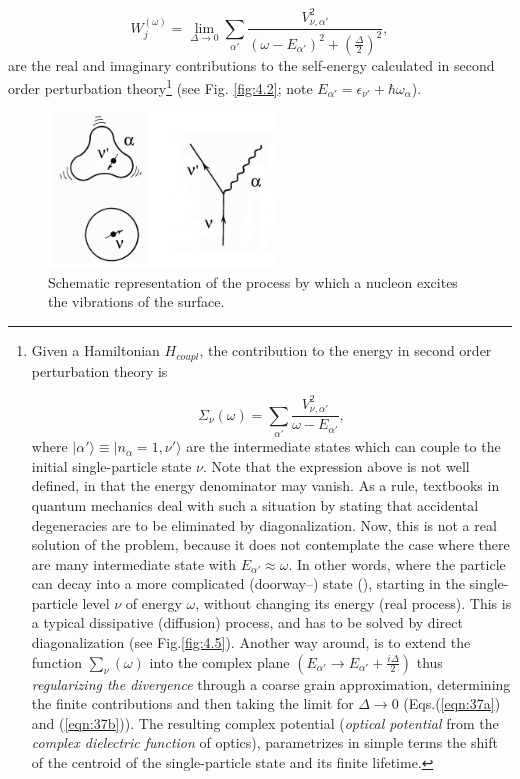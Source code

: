 \begin{equation}
W_j^{(\omega)}  = \lim_{\Delta \rightarrow 0} \sum_{\alpha'} \frac{V_{\nu ,\alpha'}^2}{(\omega -E_{\alpha'})^2 + (\frac{\Delta}{2})^2},
\label{eqn:37b}
\end{equation}
are the real and imaginary contributions to the self-energy calculated in second order perturbation theory\footnote{Given a Hamiltonian $H_{coupl}$, the contribution to the energy in second order perturbation theory is

{\protect
\begin{equation}
\nonumber\Sigma_{\nu}(\omega) = \sum_{\alpha'} \frac{V_{\nu ,\alpha'}^2}{\omega - E_{\alpha'}} ,
\label{eqn:37c}
\end{equation}
}
where $|\alpha' \rangle \equiv |n_{\alpha}=1,\nu' \rangle$ are the intermediate states which can couple to the initial single-particle state $\nu$. Note that the expression above is not well defined, in that the energy denominator may vanish. As a rule, textbooks in quantum mechanics deal with such a situation by stating that accidental degeneracies are to be eliminated by diagonalization. Now, this is not a real solution of the problem, because it does not contemplate the case where there are many intermediate state with $E_{\alpha'} \approx \omega$. In other words, where the particle can decay into a more complicated (doorway--) state (\cite{Feshbach:58}), starting in the single-particle level $\nu$ of energy $\omega$, without changing its energy (real process). This is a typical dissipative (diffusion) process, and has to be solved by direct diagonalization (see Fig.\ref{fig:4.5}). Another way around, is to extend the function $\sum_{\nu}(\omega)$ into the complex plane $(E_{\alpha'} \rightarrow E_{\alpha'} + \frac{i\Delta}{2})$ thus {\it regularizing the divergence} through a coarse grain approximation, determining the finite contributions and then taking the limit for $\Delta \rightarrow 0$ (Eqs.(\ref{eqn:37a}) and (\ref{eqn:37b})). The resulting complex potential ({\it optical potential} from the {\it complex dielectric function} of optics), parametrizes in simple terms the shift of the centroid of the single-particle state and its finite lifetime.} (see Fig. \ref{fig:4.2}; note $E_{\alpha'}=\epsilon_{\nu'}+\hbar\omega_\alpha$).

\begin{figure}[h!]
\centerline {
\includegraphics*[width=6cm]{introduccion/figs/figintroD1}
}
\caption{Schematic representation of the process by which a nucleon excites the vibrations of the surface.}
\label{fig:4.1}
\end{figure}

